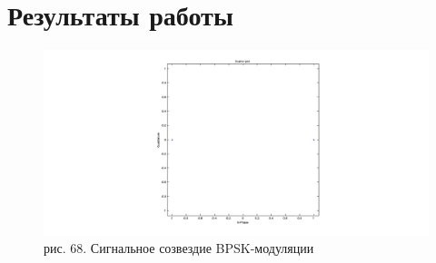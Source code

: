 \documentclass[10pt,a4paper]{report}
\begin{document}
\section{Результаты работы}
\begin{figure}
\begin{center}
\includegraphics[width=150mm, scale = 0.9]{91_1}\newline
рис. 68. Сигнальное созвездие BPSK-модуляции\newline
\end{center}
\end{figure}
\end{document}
